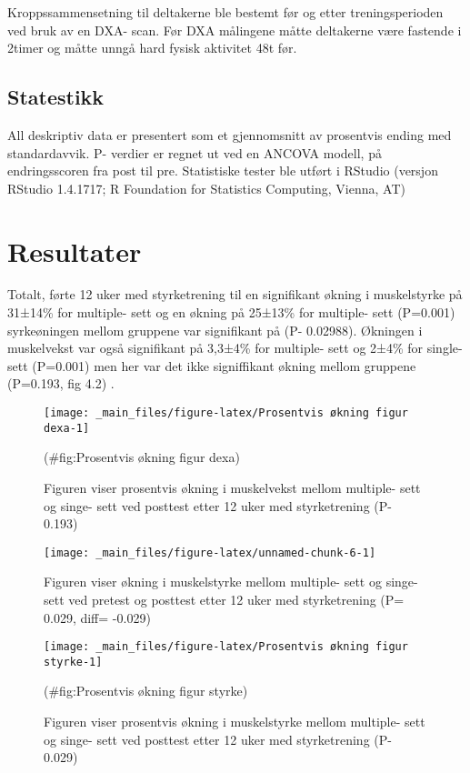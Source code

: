 \documentclass[
]{book}
\begin{document}
Kroppssammensetning til deltakerne ble bestemt før og etter treningsperioden ved bruk av en DXA- scan. Før DXA målingene måtte deltakerne være fastende i 2timer og måtte unngå hard fysisk aktivitet 48t før. ~

\hypertarget{statestikk}{%
\subsection{Statestikk}\label{statestikk}}

All deskriptiv data er presentert som et gjennomsnitt av prosentvis ending med standardavvik. P- verdier er regnet ut ved en ANCOVA modell, på endringsscoren fra post til pre. Statistiske tester ble utført i RStudio (versjon RStudio 1.4.1717; R Foundation for Statistics Computing, Vienna, AT)

\hypertarget{resultater}{%
\section{Resultater}\label{resultater}}

Totalt, førte 12 uker med styrketrening til en signifikant økning i muskelstyrke på 31±14\% for multiple- sett og en økning på 25±13\% for multiple- sett (P=0.001) syrkeøningen mellom gruppene var signifikant på (P- 0.02988). Økningen i muskelvekst var også signifikant på 3,3±4\% for multiple- sett og 2±4\% for single- sett (P=0.001) men her var det ikke signiffikant økning mellom gruppene (P=0.193, fig 4.2) .

\begin{figure}
\texttt{[image: \_main\_files/figure-latex/Prosentvis økning figur dexa-1]} \caption{Figuren viser prosentvis økning i muskelvekst mellom multiple- sett og singe- sett ved posttest etter 12 uker med styrketrening (P- 0.193)}(\#fig:Prosentvis økning figur dexa)
\end{figure}

\begin{figure}
\texttt{[image: \_main\_files/figure-latex/unnamed-chunk-6-1]} \caption{Figuren viser økning i muskelstyrke mellom multiple- sett og singe- sett ved pretest og posttest etter 12 uker med styrketrening (P= 0.029, diff= -0.029)}\label{fig:unnamed-chunk-6}
\end{figure}

\begin{figure}
\texttt{[image: \_main\_files/figure-latex/Prosentvis økning figur styrke-1]} \caption{Figuren viser prosentvis økning i muskelstyrke mellom multiple- sett og singe- sett ved posttest etter 12 uker med styrketrening (P- 0.029)}(\#fig:Prosentvis økning figur styrke)
\end{figure}
\end{document}
